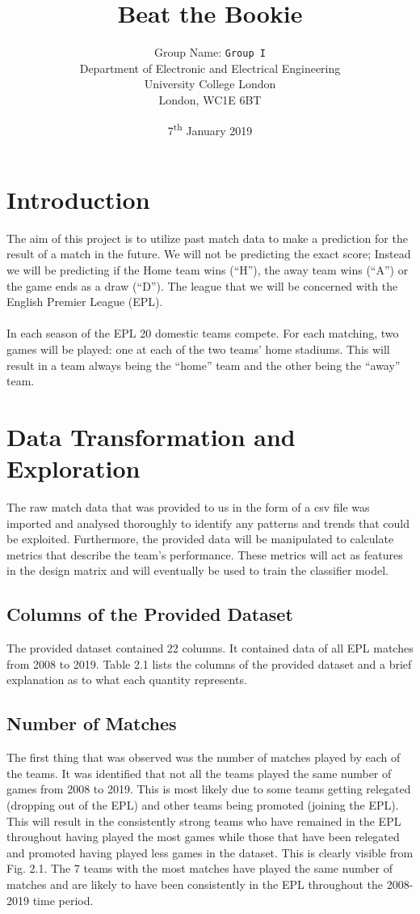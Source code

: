 \documentclass[a4paper,12pt]{article}
\title{Beat the Bookie}
\author
{
	Group Name: \texttt{Group I}\\
	Department of Electronic and Electrical Engineering\\
	University College London\\
	London, WC1E 6BT\\
}
\date{7\textsuperscript{th} January 2019}
\begin{document}
	
	\maketitle
	
	\section{Introduction}
	
	The aim of this project is to utilize past match data to make a prediction for the result of a match in the future. We will not be predicting the exact score; Instead we will be predicting if the Home team wins (“H”), the away team wins (“A”) or the game ends as a draw (“D”). The league that we will be concerned with the English Premier League (EPL).\\
	\\
	In each season of the EPL 20 domestic teams compete. For each matching, two games will be played: one at each of the two teams’ home stadiums. This will result in a team always being the “home” team and the other being the “away” team.  
	
	\section{Data Transformation and Exploration}
	
	The raw match data that was provided to us in the form of a csv file was imported and analysed thoroughly to identify any patterns and trends that could be exploited. Furthermore, the provided data will be manipulated to calculate metrics that describe the team’s performance. These metrics will act as features in the design matrix and will eventually be used to train the classifier model. 
	
	\subsection{Columns of the Provided Dataset }
	
	The provided dataset contained 22 columns. It contained data of all EPL matches from 2008 to 2019. Table 2.1 lists the columns of the provided dataset and a brief explanation as to what each quantity represents.
	
	\subsection{Number of Matches}
	
	The first thing that was observed was the number of matches played by each of the teams. It was identified that not all the teams played the same number of games from 2008 to 2019. This is most likely due to some teams getting relegated (dropping out of the EPL) and other teams being promoted (joining the EPL). This will result in the consistently strong teams who have remained in the EPL throughout having played the most games while those that have been relegated and promoted having played less games in the dataset. This is clearly visible from Fig. 2.1. The 7 teams with the most matches have played the same number of matches and are likely to have been consistently in the EPL throughout the 2008-2019 time period.  
	
\end{document}
